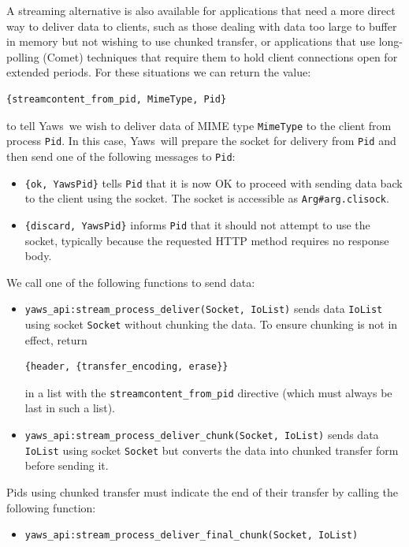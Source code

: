 \documentclass[11pt,oneside,english]{book}
\newcommand{\Yaws}            %
        {{\sc Yaws}}
\begin{document}
A streaming alternative is also available for applications that need a
more direct way to deliver data to clients, such as those dealing with
data too large to buffer in memory but not wishing to use chunked
transfer, or applications that use long-polling (Comet) techniques
that require them to hold client connections open for extended
periods. For these situations we can return the value:

\begin{verbatim}
{streamcontent_from_pid, MimeType, Pid}
\end{verbatim}

\noindent to tell \Yaws\ we wish to deliver data of MIME type
\verb+MimeType+ to the client from process \verb+Pid+. In this case,
\Yaws\ will prepare the socket for delivery from \verb+Pid+ and then
send one of the following messages to \verb+Pid+:
\begin{itemize}
\item \verb+{ok, YawsPid}+ tells \verb+Pid+ that it is now OK to
  proceed with sending data back to the client using the socket. The
  socket is accessible as \verb+Arg#arg.clisock+.

\item \verb+{discard, YawsPid}+ informs \verb+Pid+ that it should not
  attempt to use the socket, typically because the requested HTTP
  method requires no response body.
\end{itemize}

We call one of the following functions to send data:
\begin{itemize}
\item \verb+yaws_api:stream_process_deliver(Socket, IoList)+ sends data
  \verb+IoList+ using socket \verb+Socket+ without chunking the data. To
  ensure chunking is not in effect, return

\begin{verbatim}
{header, {transfer_encoding, erase}}
\end{verbatim}

  in a list with the \verb+streamcontent_from_pid+ directive (which must
  always be last in such a list).

\item \verb+yaws_api:stream_process_deliver_chunk(Socket, IoList)+
  sends data \verb+IoList+ using socket \verb+Socket+ but converts
  the data into chunked transfer form before sending it.
\end{itemize}

Pids using chunked transfer must indicate the end of their transfer by
calling the following function:
\begin{itemize}
\item \verb+yaws_api:stream_process_deliver_final_chunk(Socket, IoList)+
\end{itemize}
\end{document}
